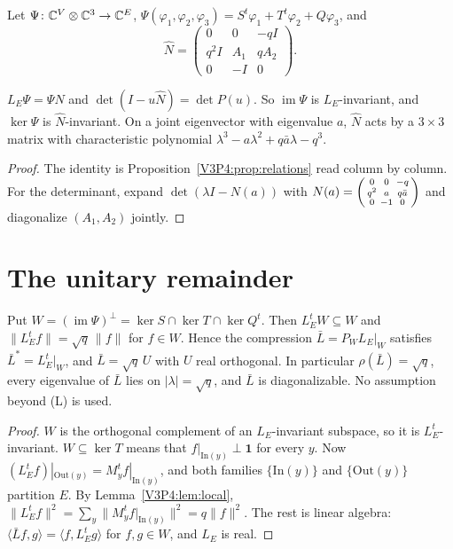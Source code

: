 Let $\Psi\colon\mathbb{C}^{V}\otimes\mathbb{C}^{3}\to\mathbb{C}^{E}$, $\Psi(\varphi_1,\varphi_2,\varphi_3)=S^{t}\varphi_1+T^{t}\varphi_2+Q\varphi_3$, and
\[
\widehat N=\begin{pmatrix}0&0&-qI\\ q^{2}I&A_1&qA_2\\ 0&-I&0\end{pmatrix}.
\]

\begin{theorem}\label{V3P4:thm:vertex}
$L_E\Psi=\Psi\widehat N$ and $\det(I-u\widehat N)=\det P(u)$. So $\operatorname{im}\Psi$ is
$L_E$-invariant, and $\ker\Psi$ is $\widehat N$-invariant. On a joint eigenvector with
eigenvalue $a$, $\widehat N$ acts by a $3\times3$ matrix with characteristic polynomial
$\lambda^{3}-a\lambda^{2}+q\bar a\lambda-q^{3}$.
\end{theorem}

\begin{proof}
The identity is Proposition~\ref{V3P4:prop:relations} read column by column. For the
determinant, expand $\det(\lambda I-N(a))$ with
$N(a)=\begin{psmallmatrix}0&0&-q\\q^{2}&a&q\bar a\\0&-1&0\end{psmallmatrix}$ and diagonalize
$(A_1,A_2)$ jointly.
\end{proof}

\section{The unitary remainder}\label{V3P4:sec:remainder}

\begin{theorem}\label{V3P4:thm:unitary}
Put $W=(\operatorname{im}\Psi)^{\perp}=\ker S\cap\ker T\cap\ker Q^{t}$. Then $L_E^{t}W\subseteq
W$ and $\|L_E^{t}f\|=\sqrt q\,\|f\|$ for $f\in W$. Hence the compression $\bar L=P_WL_E|_W$
satisfies $\bar L^{*}=L_E^{t}|_W$, and $\bar L=\sqrt q\,U$ with $U$ real orthogonal. In
particular $\rho(\bar L)=\sqrt q$, every eigenvalue of $\bar L$ lies on $|\lambda|=\sqrt q$,
and $\bar L$ is diagonalizable. No assumption beyond \textup{(L)} is used.
\end{theorem}

\begin{proof}
$W$ is the orthogonal complement of an $L_E$-invariant subspace, so it is $L_E^{t}$-invariant.
$W\subseteq\ker T$ means that $f|_{\mathrm{In}(y)}\perp\mathbf 1$ for every $y$. Now
$(L_E^{t}f)|_{\mathrm{Out}(y)}=M_y^{t}f|_{\mathrm{In}(y)}$, and both families
$\{\mathrm{In}(y)\}$ and $\{\mathrm{Out}(y)\}$ partition $E$. By Lemma~\ref{V3P4:lem:local},
$\|L_E^{t}f\|^{2}=\sum_y\|M_y^{t}f|_{\mathrm{In}(y)}\|^{2}=q\|f\|^{2}$. The rest is linear
algebra: $\langle\bar Lf,g\rangle=\langle f,L_E^{t}g\rangle$ for $f,g\in W$, and $L_E$ is real.
\end{proof}

